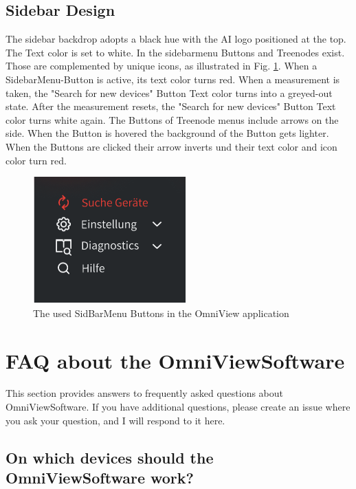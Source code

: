 \documentclass[]{scrreprt}
\begin{document}
\subsection{Sidebar Design}


The sidebar backdrop adopts a black hue with the AI logo positioned at the top. The Text color is set to white.
In the sidebarmenu Buttons and Treenodes exist. Those are complemented by unique icons, as illustrated in Fig. \ref{fig: SideMenuIcons}.
 When a SidebarMenu-Button is active, its text color turns red. When a measurement is taken, the "Search for new devices" Button Text color turns into a greyed-out state.
  After the measurement resets, the "Search for new devices" Button Text color turns white again. The Buttons of Treenode menus include arrows on the side.
   When the Button is hovered the background of the Button gets lighter.
 When the Buttons are clicked their arrow inverts und their text color and icon color turn red.


\begin{figure}
    \includegraphics[width=.4\textwidth]{assets/pictures/SideBarMenuButtons.png}
    \caption[]{The used SidBarMenu Buttons in the OmniView application}
    \label{fig: SideMenuIcons}
\end{figure}




    \section{FAQ about the OmniViewSoftware}


    This section provides answers to frequently asked questions about OmniViewSoftware. If you have additional questions, please create an issue where you ask your question, and I will respond to it here.


    \subsection{On which devices should the OmniViewSoftware work?}
\end{document}
